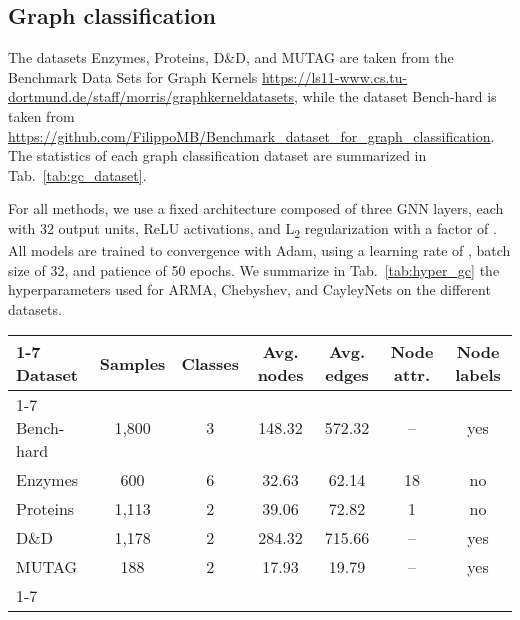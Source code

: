 \documentclass{article}
\begin{document}
\subsection{Graph classification}

The datasets Enzymes, Proteins, D\&D, and MUTAG are taken from the Benchmark Data Sets for Graph Kernels \url{https://ls11-www.cs.tu-dortmund.de/staff/morris/graphkerneldatasets}, while the dataset Bench-hard is taken from \url{https://github.com/FilippoMB/Benchmark_dataset_for_graph_classification}.
The statistics of each graph classification dataset are summarized in Tab.~\ref{tab:gc_dataset}.

For all methods, we use a fixed architecture composed of three GNN layers, each with 32 output units, ReLU activations, and L\textsubscript{2} regularization with a factor of . 
All models are trained to convergence with Adam, using a learning rate of , batch size of 32, and patience of 50 epochs. 
We summarize in Tab.~\ref{tab:hyper_gc} the hyperparameters used for ARMA, Chebyshev, and CayleyNets on the different datasets. 


\bgroup
\def\arraystretch{1.0} \begin{table*}[!ht]
\small
\centering
\caption{Summary of the graph classification datasets.} 
\label{tab:gc_dataset}
\begin{tabular}{lcccccc}
\cmidrule[1.5pt]{1-7}
\textbf{Dataset} & \textbf{Samples} & \textbf{Classes} & \textbf{Avg. nodes} & \textbf{Avg. edges} & \textbf{Node attr.} & \textbf{Node labels} \\
\cmidrule[.5pt]{1-7}
Bench-hard   & 1,800  & 3  & 148.32 & 572.32 & -- & yes \\
Enzymes      & 600   & 6  & 32.63  & 62.14  & 18 & no  \\
Proteins     & 1,113  & 2  & 39.06  & 72.82  & 1  & no  \\
D\&D         & 1,178  & 2  & 284.32 & 715.66 & -- & yes \\
MUTAG        & 188   & 2  & 17.93  & 19.79  & -- & yes \\
\cmidrule[1.5pt]{1-7}
\end{tabular}
\end{table*}
\egroup
\end{document}

